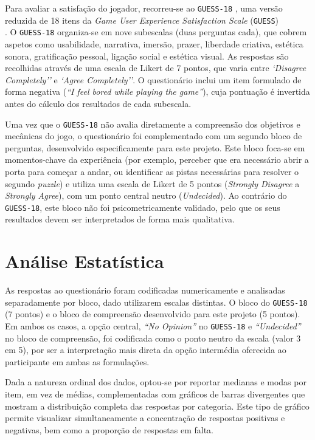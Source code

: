 \documentclass[a4paper, 12pt]{book}
\begin{document}
Para avaliar a satisfação do jogador, recorreu-se ao \texttt{GUESS-18}
\cite{guess18}, uma versão reduzida de 18 itens da
\textit{Game User Experience Satisfaction Scale} (\texttt{GUESS})\\
\cite{guess}. O \texttt{GUESS-18} organiza-se em nove subescalas
(duas perguntas cada), que cobrem aspetos como usabilidade, narrativa,
imersão, prazer, liberdade criativa, estética sonora, gratificação pessoal,
ligação social e estética visual. As respostas são recolhidas através de uma 
escala de Likert de 7 pontos, que varia entre \textit{`Disagree Completely''} 
e \textit{`Agree Completely''}. O questionário inclui um item formulado de forma 
negativa (\textit{``I feel bored while playing the game''}), cuja pontuação é 
invertida antes do cálculo dos resultados de cada subescala.
\par
Uma vez que o \texttt{GUESS-18} não avalia diretamente a compreensão dos
objetivos e mecânicas do jogo, o questionário foi complementado com um
segundo bloco de perguntas, desenvolvido especificamente para este projeto.
Este bloco foca-se em momentos-chave da experiência (por exemplo, perceber
que era necessário abrir a porta para começar a andar, ou identificar as
pistas necessárias para resolver o segundo \textit{puzzle}) e utiliza uma
escala de Likert de 5 pontos (\textit{Strongly Disagree} a \textit{Strongly
Agree}), com um ponto central neutro (\textit{Undecided}). Ao contrário do
\texttt{GUESS-18}, este bloco não foi psicometricamente validado, pelo que os
seus resultados devem ser interpretados de forma mais qualitativa.

\section{Análise Estatística}
\label{sec:analise-estatistica}

As respostas ao questionário foram codificadas numericamente e analisadas
separadamente por bloco, dado utilizarem escalas distintas. O bloco do
\texttt{GUESS-18} (7 pontos) e o bloco de compreensão desenvolvido para este
projeto (5 pontos). Em ambos os casos, a opção central, \textit{``No
Opinion''} no \texttt{GUESS-18} e \textit{``Undecided''} no bloco de
compreensão, foi codificada como o ponto neutro da escala (valor 3 em 5),
por ser a interpretação mais direta da opção intermédia oferecida ao
participante em ambas as formulações.

Dada a natureza ordinal dos dados, optou-se por reportar medianas e modas por
item, em vez de médias, complementadas com gráficos de barras divergentes que
mostram a distribuição completa das respostas por categoria. Este tipo de
gráfico permite visualizar simultaneamente a concentração de respostas
positivas e negativas, bem como a proporção de respostas em falta.
\end{document}
